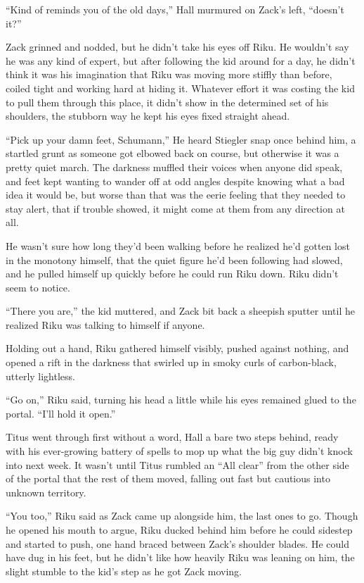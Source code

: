 ``Kind of reminds you of the old days,'' Hall murmured on Zack's left, ``doesn't it?''

Zack grinned and nodded, but he didn't take his eyes off Riku. He wouldn't say he was any kind of expert, but after following the kid around for a day, he didn't think it was his imagination that Riku was moving more stiffly than before, coiled tight and working hard at hiding it. Whatever effort it was costing the kid to pull them through this place, it didn't show in the determined set of his shoulders, the stubborn way he kept his eyes fixed straight ahead.

``Pick up your damn feet, Schumann,'' He heard Stiegler snap once behind him, a startled grunt as someone got elbowed back on course, but otherwise it was a pretty quiet march. The darkness muffled their voices when anyone did speak, and feet kept wanting to wander off at odd angles despite knowing what a bad idea it would be, but worse than that was the eerie feeling that they needed to stay alert, that if trouble showed, it might come at them from any direction at all.

\scenechange

He wasn't sure how long they'd been walking before he realized he'd gotten lost in the monotony himself, that the quiet figure he'd been following had slowed, and he pulled himself up quickly before he could run Riku down. Riku didn't seem to notice.

``There you are,'' the kid muttered, and Zack bit back a sheepish sputter until he realized Riku was talking to himself if anyone.

Holding out a hand, Riku gathered himself visibly, pushed against nothing, and opened a rift in the darkness that swirled up in smoky curls of carbon-black, utterly lightless.

``Go on,'' Riku said, turning his head a little while his eyes remained glued to the portal. ``I'll hold it open.''

Titus went through first without a word, Hall a bare two steps behind, ready with his ever-growing battery of spells to mop up what the big guy didn't knock into next week. It wasn't until Titus rumbled an ``All clear'' from the other side of the portal that the rest of them moved, falling out fast but cautious into unknown territory.

``You too,'' Riku said as Zack came up alongside him, the last ones to go. Though he opened his mouth to argue, Riku ducked behind him before he could sidestep and started to push, one hand braced between Zack's shoulder blades. He could have dug in his feet, but he didn't like how heavily Riku was leaning on him, the slight stumble to the kid's step as he got Zack moving.

